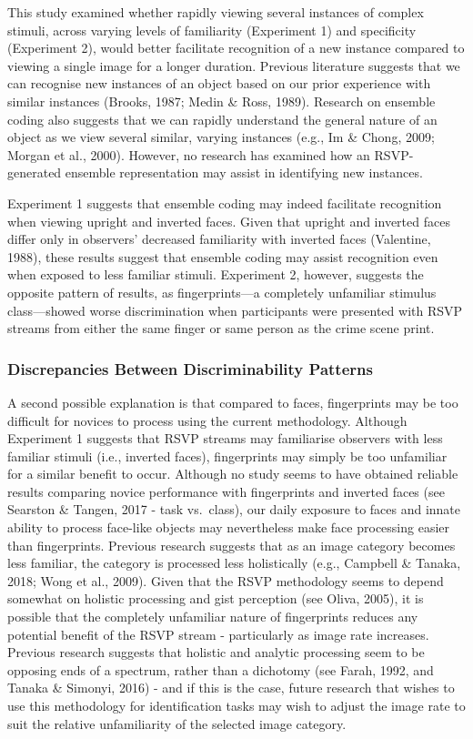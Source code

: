 \documentclass[
  english,
  man]{apa6}
\begin{document}
This study examined whether rapidly viewing several instances of complex stimuli, across varying levels of familiarity (Experiment 1) and specificity (Experiment 2), would better facilitate recognition of a new instance compared to viewing a single image for a longer duration. Previous literature suggests that we can recognise new instances of an object based on our prior experience with similar instances (Brooks, 1987; Medin \& Ross, 1989). Research on ensemble coding also suggests that we can rapidly understand the general nature of an object as we view several similar, varying instances (e.g., Im \& Chong, 2009; Morgan et al., 2000). However, no research has examined how an RSVP-generated ensemble representation may assist in identifying new instances.

Experiment 1 suggests that ensemble coding may indeed facilitate recognition when viewing upright and inverted faces. Given that upright and inverted faces differ only in observers' decreased familiarity with inverted faces (Valentine, 1988), these results suggest that ensemble coding may assist recognition even when exposed to less familiar stimuli. Experiment 2, however, suggests the opposite pattern of results, as fingerprints---a completely unfamiliar stimulus class---showed worse discrimination when participants were presented with RSVP streams from either the same finger or same person as the crime scene print.

\hypertarget{discrepancies-between-discriminability-patterns}{%
\subsubsection{Discrepancies Between Discriminability Patterns}\label{discrepancies-between-discriminability-patterns}}

A second possible explanation is that compared to faces, fingerprints may be too difficult for novices to process using the current methodology. Although Experiment 1 suggests that RSVP streams may familiarise observers with less familiar stimuli (i.e., inverted faces), fingerprints may simply be too unfamiliar for a similar benefit to occur. Although no study seems to have obtained reliable results comparing novice performance with fingerprints and inverted faces (see Searston \& Tangen, 2017 - task vs.~class), our daily exposure to faces and innate ability to process face-like objects may nevertheless make face processing easier than fingerprints. Previous research suggests that as an image category becomes less familiar, the category is processed less holistically (e.g., Campbell \& Tanaka, 2018; Wong et al., 2009). Given that the RSVP methodology seems to depend somewhat on holistic processing and gist perception (see Oliva, 2005), it is possible that the completely unfamiliar nature of fingerprints reduces any potential benefit of the RSVP stream - particularly as image rate increases. Previous research suggests that holistic and analytic processing seem to be opposing ends of a spectrum, rather than a dichotomy (see Farah, 1992, and Tanaka \& Simonyi, 2016) - and if this is the case, future research that wishes to use this methodology for identification tasks may wish to adjust the image rate to suit the relative unfamiliarity of the selected image category.
\end{document}
